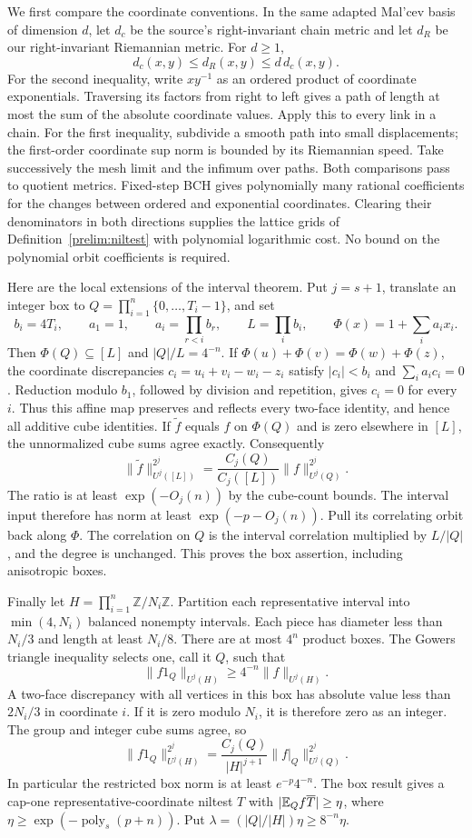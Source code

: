 We first compare the coordinate conventions. In the same adapted
Mal'cev basis of dimension $d$, let $d_c$ be the source's
right-invariant chain metric and let $d_R$ be our right-invariant
Riemannian metric. For $d\ge1$,
\[
 d_c(x,y)\le d_R(x,y)\le d\,d_c(x,y).
\]
For the second inequality, write $xy^{-1}$ as an ordered product
of coordinate exponentials. Traversing its factors from right to
left gives a path of length at most the sum of the absolute
coordinate values. Apply this to every link in a chain. For the
first inequality, subdivide a smooth path into small displacements;
the first-order coordinate sup norm is bounded by its Riemannian
speed. Take successively the mesh limit and the infimum over paths.
Both comparisons pass to quotient metrics. Fixed-step BCH gives
polynomially many rational coefficients for the changes between
ordered and exponential coordinates. Clearing their denominators
in both directions supplies the lattice grids of
Definition~\ref{prelim:niltest} with polynomial logarithmic cost.
No bound on the polynomial orbit coefficients is required.

Here are the local extensions of the interval theorem. Put
$j=s+1$, translate an integer box to
$Q=\prod_{i=1}^n\{0,\ldots,T_i-1\}$, and set
\[
 b_i=4T_i,\qquad a_1=1,\qquad
 a_i=\prod_{r<i}b_r,\qquad L=\prod_i b_i,
 \qquad \Phi(x)=1+\sum_i a_ix_i.
\]
Then $\Phi(Q)\subseteq[L]$ and $|Q|/L=4^{-n}$.
If $\Phi(u)+\Phi(v)=\Phi(w)+\Phi(z)$, the coordinate discrepancies
$c_i=u_i+v_i-w_i-z_i$ satisfy $|c_i|<b_i$ and
$\sum_i a_ic_i=0$. Reduction modulo $b_1$, followed by division
and repetition, gives $c_i=0$ for every $i$. Thus this affine
map preserves and reflects every two-face identity, and hence
all additive cube identities. If $\widetilde f$ equals $f$ on
$\Phi(Q)$ and is zero elsewhere in $[L]$, the unnormalized cube
sums agree exactly. Consequently
\[
 \|\widetilde f\|_{U^j([L])}^{2^j}
 =\frac{C_j(Q)}{C_j([L])}\|f\|_{U^j(Q)}^{2^j}.
\]
The ratio is at least $\exp(-O_j(n))$ by the cube-count bounds.
The interval input therefore has norm at least
$\exp(-p-O_j(n))$. Pull its correlating orbit back along $\Phi$.
The correlation on $Q$ is the interval correlation multiplied by
$L/|Q|$, and the degree is unchanged. This proves the box assertion,
including anisotropic boxes.

Finally let $H=\prod_{i=1}^n\mathbb Z/N_i\mathbb Z$.
Partition each representative interval into
$\min(4,N_i)$ balanced nonempty intervals. Each piece has diameter
less than $N_i/3$ and length at least $N_i/8$. There are at most
$4^n$ product boxes. The Gowers triangle inequality selects one,
call it $Q$, such that
\[
 \|f1_Q\|_{U^j(H)}\ge4^{-n}\|f\|_{U^j(H)}.
\]
A two-face discrepancy with all vertices in this box has absolute
value less than $2N_i/3$ in coordinate $i$. If it is zero modulo
$N_i$, it is therefore zero as an integer. The group and integer
cube sums agree, so
\[
 \|f1_Q\|_{U^j(H)}^{2^j}
 =\frac{C_j(Q)}{|H|^{j+1}}\|f|_Q\|_{U^j(Q)}^{2^j}.
\]
In particular the restricted box norm is at least $e^{-p}4^{-n}$.
The box result gives a cap-one representative-coordinate niltest
$T$ with $|\mathbb E_Q f\overline T|\ge\eta$, where
$\eta\ge\exp(-\operatorname{poly}_s(p+n))$. Put
$\lambda=(|Q|/|H|)\eta\ge8^{-n}\eta$.

